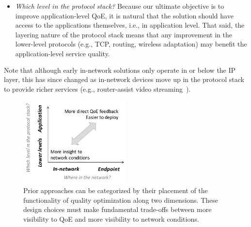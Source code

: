 \begin{itemize}
\item {\em Which level in the protocol stack?}
Because our ultimate objective is to improve application-level QoE, 
it is natural that the solution should have access to the applications themselves,
i.e., in application level.
That said, the layering nature of the protocol stack means that any improvement in 
the lower-level protocols (e.g., TCP, routing, wireless adaptation) may benefit the 
application-level service quality.

\end{itemize}
Note that although early in-network solutions only operate in or below the IP layer, 
this has since changed as in-network devices move up in the protocol stack to 
provide richer services (e.g., router-assist video 
streaming~\cite{sdndash}).



\begin{figure}[t!]
\centering
\includegraphics[width=0.5\textwidth]{figures/back-tradeoff.pdf}
\caption{Prior approaches can be categorized by their placement of
the functionality of quality optimization along two dimensions.
These design choices must make fundamental trade-offs between 
more visibility to QoE and more visibility to network conditions.}
\label{fig:back-tradeoff}
\end{figure}

